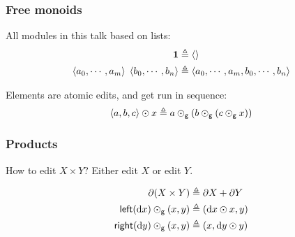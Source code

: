 \documentclass[table]{beamer}
\begin{document}
\begin{frame}
    \frametitle{Free monoids}
    All modules in this talk based on lists:
    \begin{align*}
        \mbox{\bf{1}} &\triangleq \left<\right> \\
        \left<a_0,\cdots,a_m\right>\;\left<b_0,\cdots,b_n\right>
            &\triangleq \left<a_0,\cdots,a_m,b_0,\cdots,b_n\right>
    \end{align*}

    Elements are atomic edits, and get run in sequence:
    \[\left<a,b,c\right>\odot x \triangleq
        a \odot_{\mathsf{g}} (b \odot_{\mathsf{g}} (c \odot_{\mathsf{g}} x))\]
\end{frame}

\begin{frame}
    \frametitle{Products}
    How to edit $X \times Y$? Either edit $X$ or edit $Y$.

    \begin{align*}
        \partial(X\times Y) &\triangleq \partial X + \partial Y \\
        \mathsf{left}(\textrm{d} x) \odot_{\mathsf{g}} (x,y) &\triangleq (\textrm{d} x \odot x, y) \\
        \mathsf{right}(\textrm{d} y) \odot_{\mathsf{g}} (x,y) &\triangleq (x, \textrm{d} y \odot y)
    \end{align*}
\end{frame}
\end{document}
